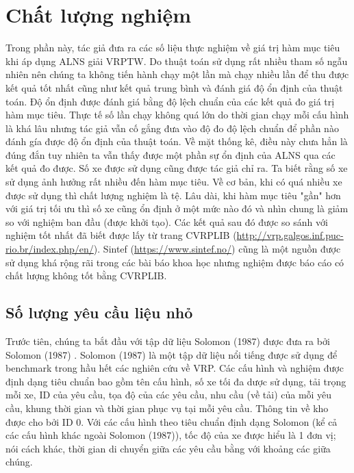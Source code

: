 \section{Chất lượng nghiệm}

Trong phần này, tác giả đưa ra các số liệu thực nghiệm về giá trị hàm mục tiêu khi áp dụng ALNS giải VRPTW. Do thuật toán sử dụng rất nhiều tham số ngẫu nhiên nên chúng ta không tiến hành chạy một lần mà chạy nhiều lần để thu được kết quả tốt nhất cũng như kết quả trung bình và đánh giá độ ổn định của thuật toán. Độ ổn định được đánh giá bằng độ lệch chuẩn của các kết quả đo giá trị hàm mục tiêu. Thực tế số lần chạy không quá lớn do thời gian chạy mỗi cấu hình là khá lâu nhưng tác giả vẫn cố gắng đưa vào độ đo độ lệch chuẩn để phần nào đánh gía được độ ổn định của thuật toán. Về mặt thống kê, điều này chưa hẳn là đúng đắn tuy nhiên ta vẫn thấy được một phần sự ổn định của ALNS qua các kết quả đo được. Số xe được sử dụng cũng được tác giả chỉ ra. Ta biết rằng số xe sử dụng ảnh hưởng rất nhiều đến hàm mục tiêu. Về cơ bản, khi có quá nhiều xe được sử dụng thì chất lượng nghiệm là tệ. Lâu dài, khi hàm mục tiêu "gần" hơn với giá trị tối ưu thì số xe cũng ổn định ở một mức nào đó và nhìn chung là giảm so với nghiệm ban đầu (được khởi tạo). Các kết quả sau đó được so sánh với nghiệm tốt nhất đã biết được lấy từ trang CVRPLIB (\href{http://vrp.galgos.inf.puc-rio.br/index.php/en/}{http://vrp.galgos.inf.puc-rio.br/index.php/en/}). Sintef (\href{https://www.sintef.no/}{https://www.sintef.no/}) cũng là một nguồn được sử dụng khá rộng rãi trong các bài báo khoa học nhưng nghiệm được báo cáo có chất lượng không tốt bằng CVRPLIB. 

\subsection{Số lượng yêu cầu liệu nhỏ}
\label{sec:exp_small}

Trước tiên, chúng ta bắt đầu với tập dữ liệu Solomon (1987) được đưa ra bởi Solomon (1987) \cite{solomon1987algorithms}. Solomon (1987) là một tập dữ liệu nổi tiếng được sử dụng để benchmark trong hầu hết các nghiên cứu về VRP. Các cấu hình và nghiệm được định dạng tiêu chuẩn bao gồm tên cấu hình, số xe tối đa dược sử dụng, tải trọng mỗi xe, ID của yêu cầu, tọa độ của các yêu cầu, nhu cầu (về tải) của mỗi yêu cầu, khung thời gian và thời gian phục vụ tại mỗi yêu cầu. Thông tin về kho được cho bởi ID 0. Với các cấu hình theo tiêu chuẩn định dạng Solomon (kể cả các cấu hình khác ngoài Solomon (1987)), tốc độ của xe được hiểu là 1 đơn vị; nói cách khác, thời gian di chuyển giữa các yêu cầu bằng với khoảng các giữa chúng. 


